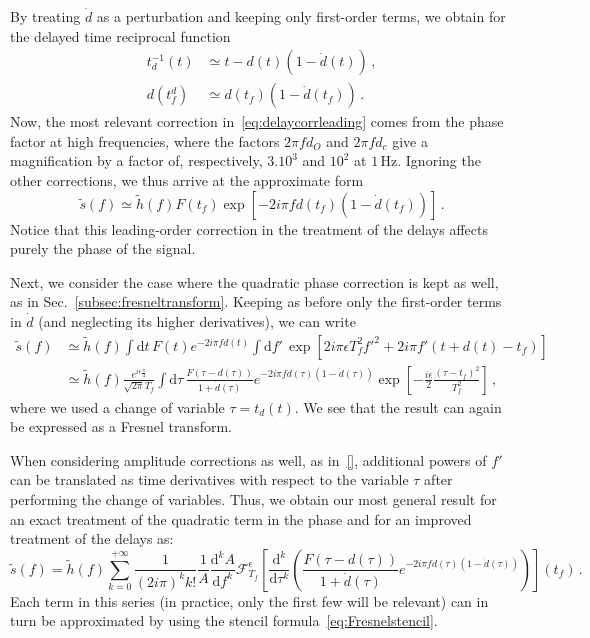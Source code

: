 \documentclass[aps,showpacs,%
prd,superscriptaddress,nofootinbib]{revtex4}
\newcommand{\be}{\begin{equation}}
\newcommand{\ee}{\end{equation}}
\newcommand\ud{{\mathrm{d}}}
\newcommand\calF{{\mathcal{F}}}
\newcommand{\nn}{\nonumber}
\newcommand{\Hz}{\,\mathrm{Hz}}
\newcommand{\tf}{t_{f}}
\newcommand{\Tf}{T_{f}}
\begin{document}
By treating $\dot{d}$ as a perturbation and keeping only first-order terms, we obtain for the delayed time reciprocal function
\begin{align}
	t_{d}^{-1}(t) &\simeq t-d(t) (1-\dot{d}(t)) \,,\nn\\
	d(t_{f}^{d}) &\simeq d(t_{f}) ( 1 - \dot{d}(t_{f})) \,.
\end{align}
Now, the most relevant correction in~\eqref{eq:delaycorrleading} comes from the phase factor at high frequencies, where the factors $2\pi f d_{O}$ and $2\pi f d_{c}$ give a magnification by a factor of, respectively, $3.10^{3}$ and $10^{2}$ at $1\Hz$. Ignoring the other corrections, we thus arrive at the approximate form
\be
	\tilde{s}(f) \simeq \tilde{h}(f) F(t_{f})\exp\left[ -2i\pi f d(t_{f}) (1-\dot{d}(t_{f})) \right] \,.
\ee
Notice that this leading-order correction in the treatment of the delays affects purely the phase of the signal.

Next, we consider the case where the quadratic phase correction is kept as well, as in Sec.~\ref{subsec:fresneltransform}. Keeping as before only the first-order terms in $\dot{d}$ (and neglecting its higher derivatives), we can write
\begin{align}
	\tilde{s}(f) &\simeq \tilde{h}(f) \int \ud t \, F(t) e^{-2i\pi f d(t)} \int \ud f' \, \exp\left[ 2i\pi \epsilon \Tf^{2} f'^{2} + 2i\pi f' (t+d(t) - \tf) \right] \nn\\
	&\simeq \tilde{h}(f) \frac{e^{i\epsilon\frac{\pi}{4}}}{\sqrt{2\pi}\Tf} \int \ud \tau \, \frac{F(\tau - d(\tau))}{1+\dot{d}(\tau)} e^{-2i\pi f d(\tau)(1-\dot{d}(\tau))}\exp\left[ -\frac{i\epsilon}{2} \frac{(\tau - \tf)^{2}}{\Tf^{2}} \right] \,,
\end{align}
where we used a change of variable $\tau = t_{d}(t)$. We see that the result can again be expressed as a Fresnel transform.

When considering amplitude corrections as well, as in~\eqref{}, additional powers of $f'$ can be translated as time derivatives with respect to the variable $\tau$ after performing the change of variables. Thus, we obtain our most general result for an exact treatment of the quadratic term in the phase and for an improved treatment of the delays as:
\be
	\tilde{s}(f) = \tilde{h}(f) \sum\limits_{k=0}^{+\infty} \frac{1}{(2i\pi)^{k} k!} \frac{1}{A} \frac{\ud^{k}A}{\ud f^{k}}  \calF^{\epsilon}_{\Tf} \left[ \frac{\ud^{k}}{\ud \tau^{k}} \left( \frac{F(\tau - d(\tau))}{1+\dot{d}(\tau)} e^{-2i\pi f d(\tau)(1-\dot{d}(\tau))} \right) \right] (\tf) \,.
\ee
Each term in this series (in practice, only the first few will be relevant) can in turn be approximated by using the stencil formula~\eqref{eq:Fresnelstencil}.
\end{document}
